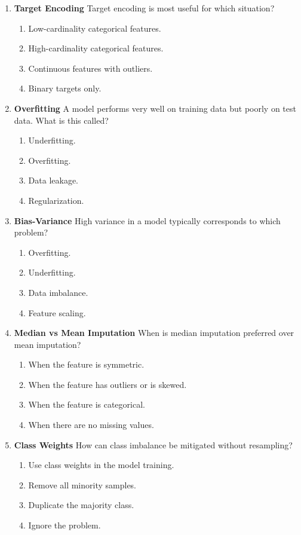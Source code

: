 \documentclass{article}
\begin{document}
\begin{enumerate}[label=\textbf{Q\arabic*.}]
		\item \textbf{Target Encoding}
		Target encoding is most useful for which situation?
		\begin{enumerate}[label=\Alph*.]
			\item Low-cardinality categorical features.
			\item High-cardinality categorical features.
			\item Continuous features with outliers.
			\item Binary targets only.
		\end{enumerate}
		
		\item \textbf{Overfitting}
		A model performs very well on training data but poorly on test data. What is this called?
		\begin{enumerate}[label=\Alph*.]
			\item Underfitting.
			\item Overfitting.
			\item Data leakage.
			\item Regularization.
		\end{enumerate}
		
		\item \textbf{Bias-Variance}
		High variance in a model typically corresponds to which problem?
		\begin{enumerate}[label=\Alph*.]
			\item Overfitting.
			\item Underfitting.
			\item Data imbalance.
			\item Feature scaling.
		\end{enumerate}
		
		\item \textbf{Median vs Mean Imputation}
		When is median imputation preferred over mean imputation?
		\begin{enumerate}[label=\Alph*.]
			\item When the feature is symmetric.
			\item When the feature has outliers or is skewed.
			\item When the feature is categorical.
			\item When there are no missing values.
		\end{enumerate}
		
		\item \textbf{Class Weights}
		How can class imbalance be mitigated without resampling?
		\begin{enumerate}[label=\Alph*.]
			\item Use class weights in the model training.
			\item Remove all minority samples.
			\item Duplicate the majority class.
			\item Ignore the problem.
		\end{enumerate}
		

\end{enumerate}
\end{document}
